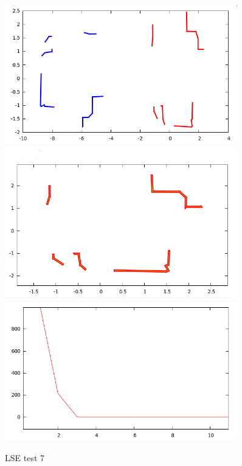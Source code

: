 \documentclass[a4paper, onecolumn]{report}
\begin{document}
\begin{figure}[htbp]
\centering
\includegraphics[width=0.9\textwidth]{images/foto_test/0.5_7_-4.7124/before_after.png}
\includegraphics[width=0.9\textwidth]{images/foto_test/0.5_7_-4.7124/result.png}
\includegraphics[width=0.9\textwidth]{images/foto_test/0.5_7_-4.7124/chi_new.png}
\caption{LSE test 7}
\end{figure}
\end{document}

